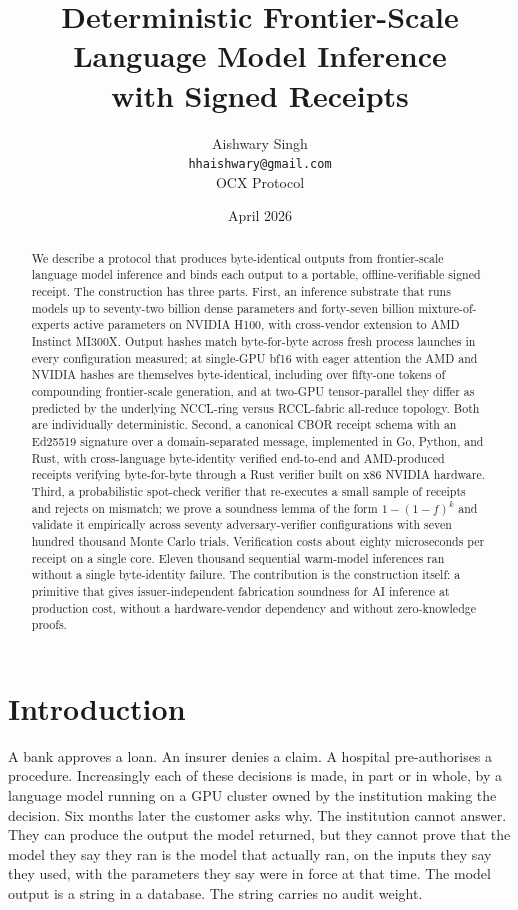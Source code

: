 \documentclass[10pt]{article}
\title{\textbf{Deterministic Frontier-Scale Language Model Inference\\with Signed Receipts}}
\author{Aishwary Singh\\ \texttt{hhaishwary@gmail.com}\\ OCX Protocol}
\date{April 2026}
\begin{document}
\maketitle

\begin{abstract}
\noindent
We describe a protocol that produces byte-identical outputs from frontier-scale language model inference and binds each output to a portable, offline-verifiable signed receipt. The construction has three parts. First, an inference substrate that runs models up to seventy-two billion dense parameters and forty-seven billion mixture-of-experts active parameters on NVIDIA H100, with cross-vendor extension to AMD Instinct MI300X. Output hashes match byte-for-byte across fresh process launches in every configuration measured; at single-GPU bf16 with eager attention the AMD and NVIDIA hashes are themselves byte-identical, including over fifty-one tokens of compounding frontier-scale generation, and at two-GPU tensor-parallel they differ as predicted by the underlying NCCL-ring versus RCCL-fabric all-reduce topology. Both are individually deterministic. Second, a canonical CBOR receipt schema with an Ed25519 signature over a domain-separated message, implemented in Go, Python, and Rust, with cross-language byte-identity verified end-to-end and AMD-produced receipts verifying byte-for-byte through a Rust verifier built on x86 NVIDIA hardware. Third, a probabilistic spot-check verifier that re-executes a small sample of receipts and rejects on mismatch; we prove a soundness lemma of the form $1 - (1-f)^k$ and validate it empirically across seventy adversary-verifier configurations with seven hundred thousand Monte Carlo trials. Verification costs about eighty microseconds per receipt on a single core. Eleven thousand sequential warm-model inferences ran without a single byte-identity failure. The contribution is the construction itself: a primitive that gives issuer-independent fabrication soundness for AI inference at production cost, without a hardware-vendor dependency and without zero-knowledge proofs.
\end{abstract}

\section{Introduction}

A bank approves a loan. An insurer denies a claim. A hospital pre-authorises a procedure. Increasingly each of these decisions is made, in part or in whole, by a language model running on a GPU cluster owned by the institution making the decision. Six months later the customer asks why. The institution cannot answer. They can produce the output the model returned, but they cannot prove that the model they say they ran is the model that actually ran, on the inputs they say they used, with the parameters they say were in force at that time. The model output is a string in a database. The string carries no audit weight.
\end{document}
